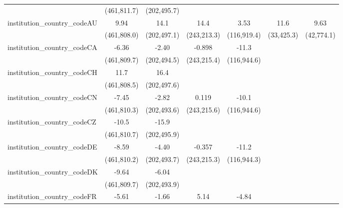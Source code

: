 \begin{tabular}{lcccccc}
                                         & (461,811.7)   & (202,495.7)   &               &               &            &   \\   
   institution\_country\_codeAU          & 9.94          & 14.1          & 14.4          & 3.53          & 11.6       & 9.63\\   
                                         & (461,808.0)   & (202,497.1)   & (243,213.3)   & (116,919.4)   & (33,425.3) & (42,774.1)\\   
   institution\_country\_codeCA          & -6.36         & -2.40         & -0.898        & -11.3         &            &   \\   
                                         & (461,809.7)   & (202,494.5)   & (243,215.4)   & (116,944.6)   &            &   \\   
   institution\_country\_codeCH          & 11.7          & 16.4          &               &               &            &   \\   
                                         & (461,808.5)   & (202,497.6)   &               &               &            &   \\   
   institution\_country\_codeCN          & -7.45         & -2.82         & 0.119         & -10.1         &            &   \\   
                                         & (461,810.3)   & (202,493.6)   & (243,215.6)   & (116,944.6)   &            &   \\   
   institution\_country\_codeCZ          & -10.5         & -15.9         &               &               &            &   \\   
                                         & (461,810.7)   & (202,495.9)   &               &               &            &   \\   
   institution\_country\_codeDE          & -8.59         & -4.40         & -0.357        & -11.2         &            &   \\   
                                         & (461,810.2)   & (202,493.7)   & (243,215.3)   & (116,944.3)   &            &   \\   
   institution\_country\_codeDK          & -9.64         & -6.04         &               &               &            &   \\   
                                         & (461,809.7)   & (202,493.9)   &               &               &            &   \\   
   institution\_country\_codeFR          & -5.61         & -1.66         & 5.14          & -4.84         &            &   \\   

\end{tabular}
